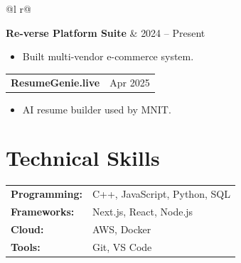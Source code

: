\documentclass[a4paper,10pt]{article}
\begin{document}
\begin{tabularx}{\linewidth}{ @{}l r@{} }

\textbf{Re-verse Platform Suite} & {\color[HTML]{371e77} 2024 -- Present} \\


\end{tabularx}



\vspace{-6pt}

\begin{itemize}[nosep, leftmargin=1.5em]

\item Built multi-vendor e-commerce system.

\end{itemize}



\begin{tabularx}{\linewidth}{ @{}l r@{} }

\textbf{ResumeGenie.live} & {\color[HTML]{371e77} Apr 2025} \\

\end{tabularx}



\vspace{-6pt}

\begin{itemize}[nosep, leftmargin=1.5em]

\item AI resume builder used by MNIT.

\end{itemize}




\section{Technical Skills}



\begin{tabularx}{\linewidth}{@{}l X@{}}

\textbf{Programming:} & C++, JavaScript, Python, SQL \\

\textbf{Frameworks:} & Next.js, React, Node.js \\

\textbf{Cloud:} & AWS, Docker \\

\textbf{Tools:} & Git, VS Code \\

\end{tabularx}
\end{document}
